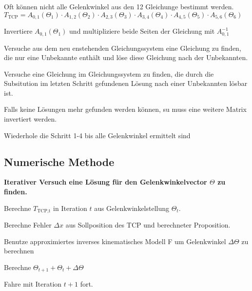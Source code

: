 Oft können nicht alle Gelenkwinkel aus den 12 Gleichunge bestimmt werden.
$T_{\text{TCP}} = A_{0,1}(\Theta_1) \cdot A_{1,2}(\Theta_2) \cdot A_{2,3}(\Theta_3)
 \cdot A_{3,4}(\Theta_4) \cdot A_{4,5}(\Theta_5) \cdot A_{5,6}(\Theta_6)$

 \begin{compactenum}
     \item Invertiere $A_{0,1}(\Theta_1)$ und multipliziere beide Seiten der Gleichung mit $A^{-1}_{0,1}$
     \item Versuche aus dem neu enstehenden Gleichungssystem eine Gleichung zu finden, die nur eine
     Unbekannte enthält und löse diese Gleichung nach der Unbekannten.
     \item Versuche eine Gleichung im Gleichungssystem zu finden, die durch die Subsitution im letzten
     Schritt gefundenen Lösung nach einer Unbekannten lösbar ist.
     \item Falls keine Lösungen mehr gefunden werden können, su muss eine weitere Matrix invertiert werden.
     \item Wiederhole die Schritt 1-4 bis alle Gelenkwinkel ermittelt sind
 \end{compactenum}

\subsection{Numerische Methode}
\textbf{Iterativer Versuch eine Lösung für den Gelenkwinkelvector $\Theta$ zu finden.}
\begin{compactitem}
     \item Berechne $T_{\text{TCP,t}}$ in Iteration $t$ aus Gelenkwinkelstellung $\Theta_t$.
     \item Berechne Fehler $\Delta x$ aus Sollposition des TCP und berechneter Proposition.
     \item Benutze approximiertes inverses kinematisches Modell F um Gelenkwinkel $\Delta \Theta$
     zu berechnen
     \item Berechne $\Theta_{t+1} + \Theta_t + \Delta\Theta$
     \item Fahre mit Iteration $t+1$ fort.
 \end{compactitem}

